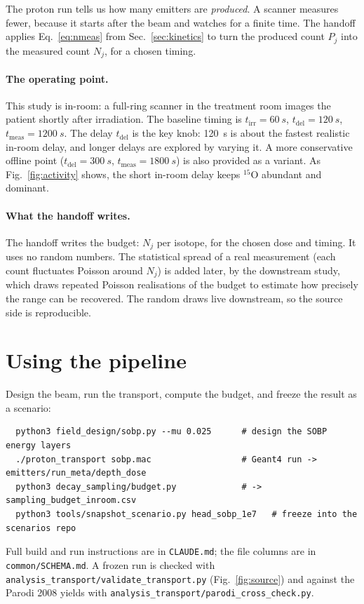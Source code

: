 \documentclass[11pt]{article}
\newcommand{\Ox}[1]{{}^{#1}\mathrm{O}}
\begin{document}
The proton run tells us how many emitters are \emph{produced}. A scanner measures
fewer, because it starts after the beam and watches for a finite time. The handoff
applies Eq.~\eqref{eq:nmeas} from Sec.~\ref{sec:kinetics} to turn the produced count
$P_j$ into the measured count $N_j$, for a chosen timing.

\paragraph{The operating point.}
This study is in-room: a full-ring scanner in the treatment room images the
patient shortly after irradiation. The baseline timing is
$t_{\mathrm{irr}}=\SI{60}{s}$, $t_{\mathrm{del}}=\SI{120}{s}$,
$t_{\mathrm{meas}}=\SI{1200}{s}$. The delay $t_{\mathrm{del}}$ is the key knob:
\SI{120}{s} is about the fastest realistic in-room delay, and longer delays are
explored by varying it. A more conservative offline point
($t_{\mathrm{del}}=\SI{300}{s}$, $t_{\mathrm{meas}}=\SI{1800}{s}$) is also provided as
a variant. As Fig.~\ref{fig:activity} shows, the short in-room delay keeps $\Ox{15}$
abundant and dominant.

\paragraph{What the handoff writes.}
The handoff writes the budget: $N_j$ per isotope, for the chosen dose and timing. It
uses no random numbers. The statistical spread of a real measurement (each count
fluctuates Poisson around $N_j$) is added later, by the downstream study, which draws
repeated Poisson realisations of the budget to estimate how precisely the range can be
recovered. The random draws live downstream, so the source side is reproducible.

\section{Using the pipeline}
\label{sec:using}

Design the beam, run the transport, compute the budget, and freeze the result as a
scenario:
\begin{verbatim}
  python3 field_design/sobp.py --mu 0.025      # design the SOBP energy layers
  ./proton_transport sobp.mac                  # Geant4 run -> emitters/run_meta/depth_dose
  python3 decay_sampling/budget.py             # -> sampling_budget_inroom.csv
  python3 tools/snapshot_scenario.py head_sobp_1e7   # freeze into the scenarios repo
\end{verbatim}
Full build and run instructions are in \texttt{CLAUDE.md}; the file columns are in
\texttt{common/SCHEMA.md}. A frozen run is checked with
\texttt{analysis\_transport/validate\_transport.py} (Fig.~\ref{fig:source}) and against
the Parodi 2008 yields with \texttt{analysis\_transport/parodi\_cross\_check.py}.
\end{document}
